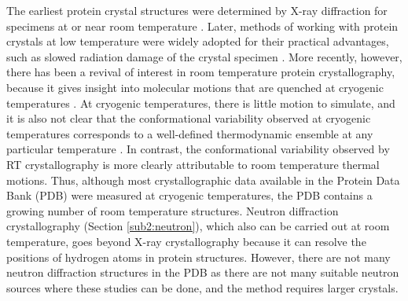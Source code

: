 \documentclass[9pt,review]{livecoms}
\begin{document}
The earliest protein crystal structures were determined by X-ray diffraction for specimens at or near room temperature \cite{muirhead_structure_1963}.
Later, methods of working with protein crystals at low temperature were widely adopted for their practical advantages, such as slowed radiation damage of the crystal specimen \cite{fischer_macromolecular_2021,thorne_determining_2023}.
More recently, however, there has been a revival of interest in room temperature protein crystallography, because it gives insight into molecular motions that are quenched at cryogenic temperatures \cite{fraser_hidden_2009,keedy_crystal_2014,fischer_macromolecular_2021,thorne_determining_2023}.
At cryogenic temperatures, there is little motion to simulate, and it is also not clear that the conformational variability observed at cryogenic temperatures corresponds to a well-defined thermodynamic ensemble at any particular temperature \cite{keedy_crystal_2014,bradford_temperature_2021}.
In contrast, the conformational variability observed by RT crystallography is more clearly attributable to room temperature thermal motions.
Thus, although most crystallographic data available in the Protein Data Bank (PDB) were measured at cryogenic temperatures, the PDB contains a growing number of room temperature structures.
Neutron diffraction crystallography (Section \ref{sub2:neutron}), which also can be carried out at room temperature, goes beyond X-ray crystallography because it can resolve the positions of hydrogen atoms in protein structures.
However, there are not many neutron diffraction structures in the PDB as there are not many suitable neutron sources where these studies can be done, and the method requires larger crystals.
\end{document}

